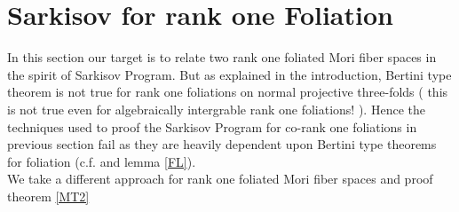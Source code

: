 \documentclass[12pt]{amsart}%
\theoremstyle{plain}
\theoremstyle{remark}
\theoremstyle{definition}
\newcommand{\<}{\leq}
\theoremstyle{definition}
\theoremstyle{definition}
\numberwithin{equation}{section}
\theoremstyle{remark}
\begin{document}
\section{Sarkisov for rank one Foliation}
In this section our target is to relate two rank one foliated Mori fiber spaces in the spirit of Sarkisov Program. But as explained in the introduction, Bertini type theorem is not true for rank one foliations on normal projective three-folds ( this is not true even for algebraically intergrable rank one foliations! ). Hence the techniques used to proof the Sarkisov Program for co-rank one foliations in previous section fail as they are heavily dependent upon Bertini type theorems for foliation (c.f. \cite[Lemma $3.26$ and Lemma $3.27$ ]{CS21 } and lemma \ref{FL}).\\
We take a different approach for rank one foliated Mori fiber spaces and proof theorem \ref{MT2}
\end{document}
